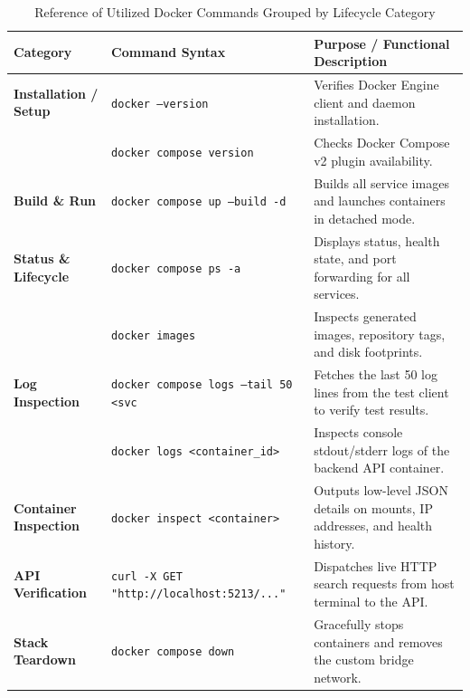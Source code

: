 \documentclass[11pt,a4paper]{article}
\begin{document}
\begin{table}[H]
\centering
\small
\caption{Reference of Utilized Docker Commands Grouped by Lifecycle Category}
\label{tab:commands_reference}
\begin{tabular}{@{}llp{8.5cm}@{}}
\toprule
\textbf{Category} & \textbf{Command Syntax} & \textbf{Purpose / Functional Description} \\ \midrule
\textbf{Installation / Setup} & \texttt{docker --version} & Verifies Docker Engine client and daemon installation. \\
 & \texttt{docker compose version} & Checks Docker Compose v2 plugin availability. \\ \midrule
\textbf{Build \& Run} & \texttt{docker compose up --build -d} & Builds all service images and launches containers in detached mode. \\ \midrule
\textbf{Status \& Lifecycle} & \texttt{docker compose ps -a} & Displays status, health state, and port forwarding for all services. \\
 & \texttt{docker images} & Inspects generated images, repository tags, and disk footprints. \\ \midrule
\textbf{Log Inspection} & \texttt{docker compose logs --tail 50 <svc\>} & Fetches the last 50 log lines from the test client to verify test results. \\
 & \texttt{docker logs <container\_id>} & Inspects console stdout/stderr logs of the backend API container. \\ \midrule
\textbf{Container Inspection} & \texttt{docker inspect <container>} & Outputs low-level JSON details on mounts, IP addresses, and health history. \\ \midrule
\textbf{API Verification} & \texttt{curl -X GET "http://localhost:5213/..."} & Dispatches live HTTP search requests from host terminal to the API. \\ \midrule
\textbf{Stack Teardown} & \texttt{docker compose down} & Gracefully stops containers and removes the custom bridge network. \\ \bottomrule
\end{tabular}
\end{table}
\end{document}
